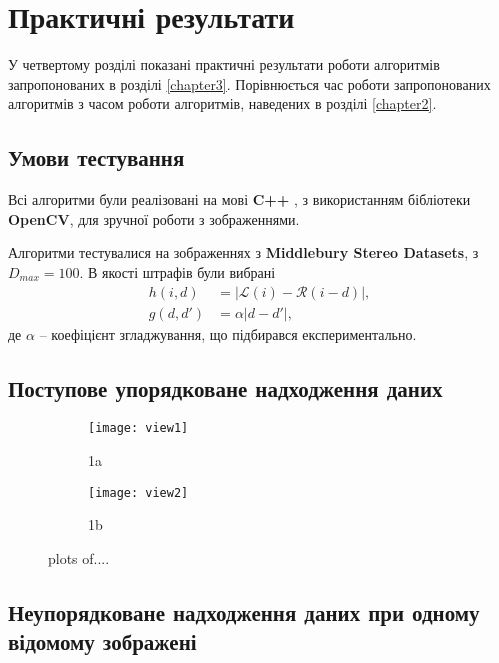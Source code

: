 \chapter{Практичні результати}\label{chapter4}

У четвертому розділі показані практичні результати роботи алгоритмів запропонованих в розділі \ref{chapter3}. 
Порівнюється час роботи запропонованих алгоритмів з часом роботи алгоритмів, наведених в розділі \ref{chapter2}.   

\section{Умови тестування}
Всі алгоритми були реалізовані на мові  \textbf{C++} , з використанням бібліотеки \textbf{OpenCV}, для зручної роботи з зображеннями.

Алгоритми тестувалися на зображеннях з \textbf{Middlebury Stereo Datasets}, з $ D_{max} = 100 $. В якості штрафів були вибрані
\begin{align}
 h(i,d) &= | \mathcal{L}(i) - \mathcal{R}(i-d) |,\\
 g(d, d') &= \alpha | d  - d'|,
\end{align}
де $ \alpha $ -- коефіцієнт згладжування, що підбирався експериментально.

\section{Поступове упорядковане надходження даних}

\begin{figure}
\begin{subfigure}{.5\textwidth}
  \centering
  \texttt{[image: view1]}
  \caption{1a}
  \label{fig:sfig1}
\end{subfigure}%
\begin{subfigure}{.5\textwidth}
  \centering
  \texttt{[image: view2]}
  \caption{1b}
  \label{fig:sfig2}
\end{subfigure}
\caption{plots of....}
\label{fig:fig}
\end{figure}

\section{Неупорядковане надходження даних при одному відомому зображені}
